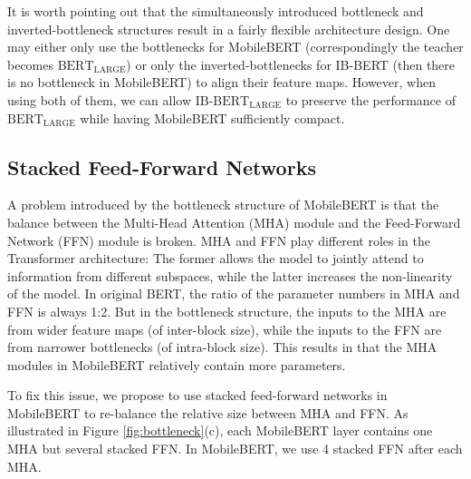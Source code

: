 \documentclass[11pt,a4paper]{article}
\begin{document}
It is worth pointing out that the simultaneously introduced bottleneck and inverted-bottleneck structures result in a fairly flexible architecture design. One may either only use the bottlenecks for MobileBERT (correspondingly the teacher becomes $\text{BERT}_\text{LARGE}$) or only the inverted-bottlenecks for IB-BERT (then there is no bottleneck in MobileBERT) to align their feature maps. However, when using both of them,  we can allow $\text{IB-BERT}_\text{LARGE}$ to preserve the performance of $\text{BERT}_\text{LARGE}$ while having MobileBERT sufficiently compact.




























\subsection{Stacked Feed-Forward Networks}




A problem introduced by the bottleneck structure of MobileBERT is that the balance between the Multi-Head Attention (MHA) module and the Feed-Forward Network (FFN) module is broken.
MHA and FFN play different roles in the Transformer architecture: The former allows the model to jointly attend to information from different subspaces, while the latter increases the non-linearity of the model.
In original BERT, the ratio of the parameter numbers in MHA and FFN is always 1:2. But in the bottleneck structure, the inputs to the MHA are from wider feature maps (of inter-block size), while the inputs to the FFN are from narrower bottlenecks (of intra-block size). This results in that the MHA modules in MobileBERT relatively contain more parameters.

To fix this issue, we propose to use stacked feed-forward networks in MobileBERT to re-balance the relative size between MHA and FFN. As illustrated in Figure \ref{fig:bottleneck}(c), each MobileBERT layer contains one MHA but several stacked FFN. In MobileBERT, we use 4 stacked FFN after each MHA.
\end{document}
